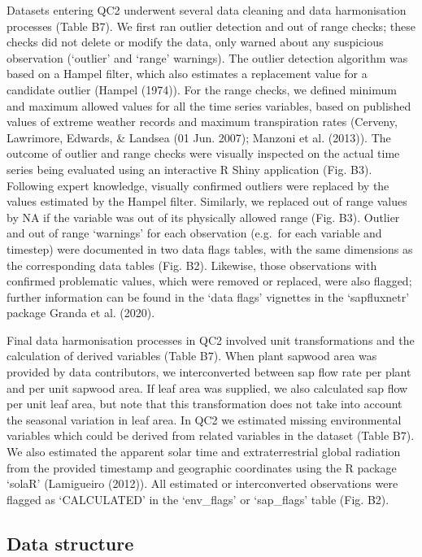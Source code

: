 \documentclass[11pt,twoside]{reedthesis}
\begin{document}
Datasets entering QC2 underwent several data cleaning and data
harmonisation processes (Table B7). We first ran outlier detection and
out of range checks; these checks did not delete or modify the data,
only warned about any suspicious observation (`outlier' and `range'
warnings). The outlier detection algorithm was based on a Hampel filter,
which also estimates a replacement value for a candidate outlier (Hampel
(1974)). For the range checks, we defined minimum and maximum allowed
values for all the time series variables, based on published values of
extreme weather records and maximum transpiration rates (Cerveny,
Lawrimore, Edwards, \& Landsea (01 Jun. 2007); Manzoni et al. (2013)).
The outcome of outlier and range checks were visually inspected on the
actual time series being evaluated using an interactive R Shiny
application (Fig. B3). Following expert knowledge, visually confirmed
outliers were replaced by the values estimated by the Hampel filter.
Similarly, we replaced out of range values by NA if the variable was out
of its physically allowed range (Fig. B3). Outlier and out of range
`warnings' for each observation (e.g.~for each variable and timestep)
were documented in two data flags tables, with the same dimensions as
the corresponding data tables (Fig. B2). Likewise, those observations
with confirmed problematic values, which were removed or replaced, were
also flagged; further information can be found in the `data flags'
vignettes in the `sapfluxnetr' package Granda et al. (2020).\par

Final data harmonisation processes in QC2 involved unit transformations
and the calculation of derived variables (Table B7). When plant sapwood
area was provided by data contributors, we interconverted between sap
flow rate per plant and per unit sapwood area. If leaf area was
supplied, we also calculated sap flow per unit leaf area, but note that
this transformation does not take into account the seasonal variation in
leaf area. In QC2 we estimated missing environmental variables which
could be derived from related variables in the dataset (Table B7). We
also estimated the apparent solar time and extraterrestrial global
radiation from the provided timestamp and geographic coordinates using
the R package `solaR' (Lamigueiro (2012)). All estimated or
interconverted observations were flagged as `CALCULATED' in the
`env\_flags' or `sap\_flags' table (Fig. B2).\par

\subsection{Data structure}\label{data-structure}
\end{document}
